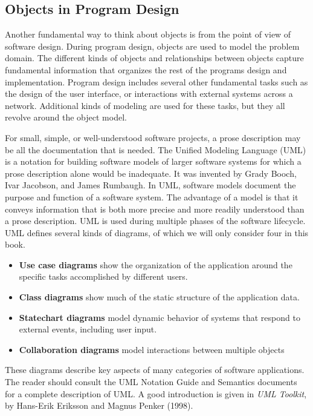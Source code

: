 \subsection[Objects in Program Design]{Objects in Program Design}
Another fundamental way to think about objects is
from the point of view of software design. During program design,
objects are used to model the problem domain. The different kinds of
objects and relationships between objects capture fundamental
information that organizes the rest of the program{\textquotesingle}s
design and implementation. Program design includes several other
fundamental tasks such as the design of the user interface, or
interactions with external systems across a network. Additional kinds
of modeling are used for these tasks, but they all revolve around the
object model.

For small, simple, or well-understood software projects, a prose description
may be all the documentation that is needed. The Unified Modeling Language
(UML) is a notation for building software models of larger software
systems for which a prose description alone would be inadequate. It was
invented by Grady Booch, Ivar Jacobson, and James Rumbaugh. In UML, software
models document the purpose and function of a software system.
The advantage of a model is that it conveys
information that is both more precise and more readily understood than
a prose description. UML is used during multiple phases of the software
lifecycle. UML defines several kinds of diagrams, of which we will only
consider four in this book.

\begin{itemize}
\item \textbf{Use case diagrams} show the organization of the
application around the specific tasks accomplished by different users.
\item \textbf{Class diagrams} show much of the static structure of the
application data.
\item \textbf{Statechart diagrams} model dynamic behavior of systems
that respond to external events, including user input.
\item \textbf{Collaboration diagrams} model interactions between
multiple objects
\end{itemize}
These diagrams describe key aspects of many categories of software
applications. The reader should consult the UML Notation Guide and
Semantics documents for a complete description of UML. A good
introduction is given in \textit{UML Toolkit}, by Hans-Erik Eriksson
and Magnus Penker (1998).

